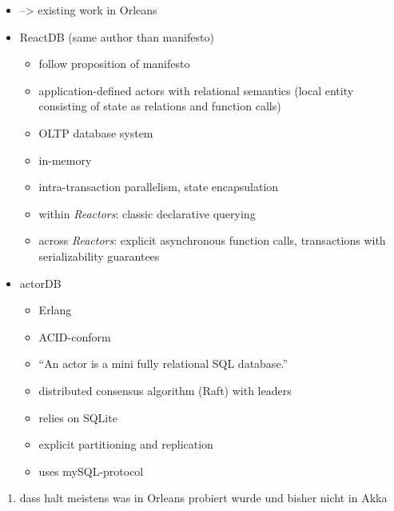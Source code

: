   
  \begin{itemize}
    \item --> existing work in Orleans
    \item ReactDB (same author than manifesto)~\cite{Shah:reactdb}
      \begin{itemize}
        \item follow proposition of manifesto
        \item application-defined actors with relational semantics (local entity consisting of state as relations and function calls)
        \item OLTP database system
        \item in-memory
        \item intra-transaction parallelism, state encapsulation
        \item within \textit{Reactors}: classic declarative querying
        \item across \textit{Reactors}: explicit asynchronous function calls, transactions with serializability guarantees
      \end{itemize}
    \item actorDB~\cite{biokoda:actordb}
      \begin{itemize}
        \item Erlang
        \item ACID-conform
        \item \enquote{An actor is a mini fully relational SQL database.}~\cite{biokoda:actordb}
        \item distributed consensus algorithm (Raft) with leaders
        \item relies on SQLite
        \item explicit partitioning and replication
        \item uses mySQL-protocol
      \end{itemize}
  \end{itemize}

\begin{enumerate}
  \item dass halt meistens was in Orleans probiert wurde und bisher nicht in Akka
\end{enumerate}
